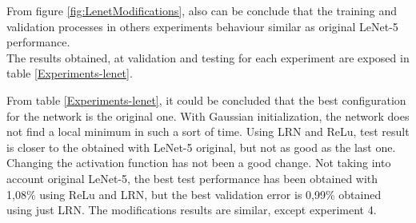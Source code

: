 From figure \ref{fig:LenetModifications}, also can be conclude that the training and validation processes in others experiments behaviour similar as original LeNet-5 performance.\\


The results obtained, at validation and testing for each experiment are exposed in table \ref{Experiments-lenet}.

\begin{table}[tb]
\centering
{}
\caption{Lenet-5 experiments results.}
\label{Experiments-lenet}
\end{table}

From table \ref{Experiments-lenet}, it could be concluded that the best configuration for the network is the original one. With Gaussian initialization, the network does not find a local minimum in such a sort of time. Using LRN and ReLu, test result is closer to the obtained with LeNet-5 original, but not as good as the last one. Changing the activation function has not been a good change. Not taking into account original LeNet-5, the best test performance has been obtained with 1,08\% using ReLu and LRN, but the best validation error is 0,99\% obtained using just LRN. The modifications results are similar, except experiment 4.


